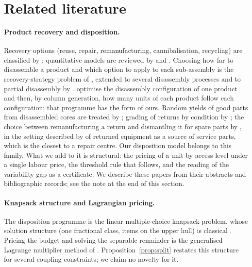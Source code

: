 \section{Related literature}\label{sec:literature}

\paragraph{Product recovery and disposition.} Recovery options (reuse, repair, remanufacturing, cannibalisation,
recycling) are classified by \citet{thierry1995}; quantitative models are reviewed by \citet{fleischmann1997} and
\citet{guide2009}. Choosing how far to disassemble a product and which option to apply to each sub-assembly is the
recovery-strategy problem of \citet{krikke1998}, extended to several disassembly processes and to partial
disassembly by \citet{teunter2006}. \citet{meacham1999} optimise the disassembly configuration of one product and
then, by column generation, how many units of each product follow each configuration; that programme has the form
of ours. Random yields of good parts from disassembled cores are treated by \citet{inderfurth2006}; grading of
returns by condition by \citet{ferguson2009}; the choice between remanufacturing a return and dismantling it for
spare parts by \citet{ferguson2011}, in the setting described by \citet{fleischmann2003} of returned equipment as a
source of service parts, which is the closest to a repair centre. Our disposition model belongs to this family. What
we add to it is structural: the pricing of a unit by access level under a single labour price, the threshold rule
that follows, and the reading of the variability gap as a certificate. We describe these papers from their abstracts
and bibliographic records; see the note at the end of this section.

\paragraph{Knapsack structure and Lagrangian pricing.} The disposition programme is the linear multiple-choice
knapsack problem, whose solution structure (one fractional class, items on the upper hull) is classical
\citep{sinha1979,zemel1980}. Pricing the budget and solving the separable remainder is the generalised Lagrange
multiplier method of \citet{everett1963}. Proposition~\ref{prop:split} restates this structure for several coupling
constraints; we claim no novelty for it.

